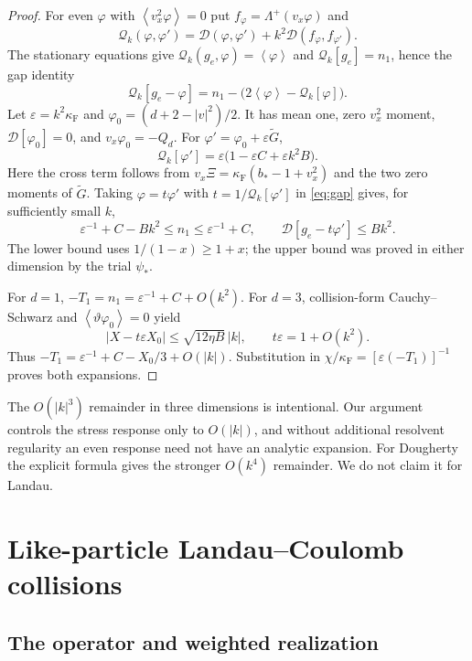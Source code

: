 \documentclass[11pt]{article}
\newcommand{\av}[1]{\left\langle #1\right\rangle}
\newcommand{\D}{\mathcal D}
\newcommand{\F}{\kappa_{\mathrm F}}
\theoremstyle{definition}
\theoremstyle{remark}
\numberwithin{equation}{section}
\begin{document}
\begin{proof}
For even $\varphi$ with $\av{v_x^2\varphi}=0$ put
$f_\varphi=\Lambda^+(v_x\varphi)$ and
\[
 \mathcal Q_k(\varphi,\varphi')
   =\D(\varphi,\varphi')+k^2\D(f_\varphi,f_{\varphi'}).
\]
The stationary equations give
$\mathcal Q_k(g_e,\varphi)=\av\varphi$ and
$\mathcal Q_k[g_e]=n_1$, hence the gap identity
\begin{equation}
 \mathcal Q_k[g_e-\varphi]
     =n_1-\bigl(2\av\varphi-\mathcal Q_k[\varphi]\bigr).
 \label{eq:gap}
\end{equation}
Let $\varepsilon=k^2\F$ and
$\varphi_0=(d+2-|v|^2)/2$. It has mean one, zero
$v_x^2$ moment, $\D[\varphi_0]=0$, and $v_x\varphi_0=-Q_d$.
For $\varphi'=\varphi_0+\varepsilon\widetilde G$,
\[
 \mathcal Q_k[\varphi']
   =\varepsilon\bigl(1-\varepsilon C+\varepsilon k^2B\bigr).
\]
Here the cross term follows from
$v_x\Xi=\F(b_*-1+v_x^2)$ and the two zero moments of $\widetilde G$.
Taking $\varphi=t\varphi'$ with $t=1/\mathcal Q_k[\varphi']$
in \eqref{eq:gap} gives, for sufficiently small $k$,
\begin{equation}
 \varepsilon^{-1}+C-Bk^2\leq n_1\leq\varepsilon^{-1}+C,\qquad
 \D[g_e-t\varphi']\leq Bk^2.
 \label{eq:ngap}
\end{equation}
The lower bound uses $1/(1-x)\geq1+x$; the upper bound was proved
in either dimension by the trial $\psi_*$.

For $d=1$, $-T_1=n_1=\varepsilon^{-1}+C+O(k^2)$.
For $d=3$, collision-form Cauchy--Schwarz and
$\av{\vartheta\varphi_0}=0$ yield
\[
 |X-t\varepsilon X_0|\leq\sqrt{12\eta B}\,|k|,
 \qquad t\varepsilon=1+O(k^2).
\]
Thus $-T_1=\varepsilon^{-1}+C-X_0/3+O(|k|)$.
Substitution in $\chi/\F=[\varepsilon(-T_1)]^{-1}$
proves both expansions.
\end{proof}

The $O(|k|^3)$ remainder in three dimensions is intentional. Our argument
controls the stress response only to $O(|k|)$, and without additional
resolvent regularity an even response need not have an analytic
expansion. For Dougherty the explicit formula gives the stronger
$O(k^4)$ remainder. We do not claim it for Landau.

\section{Like-particle Landau--Coulomb collisions}\label{sec:landau}

\subsection{The operator and weighted realization}
\end{document}
